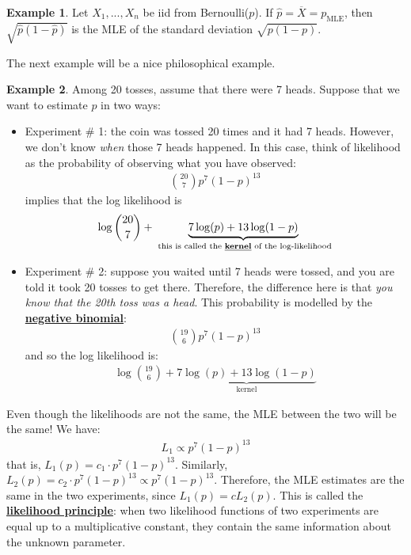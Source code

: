 \documentclass[11pt]{scrartcl}
\theoremstyle{definition}
\newtheorem{ex}{Example}
\theoremstyle{remark}
\newcommand{\dfn}[1]{\textbf{\underline{#1}}}
\begin{document}
\begin{ex}
	Let $X_1, ..., X_n$ be iid from Bernoulli($p$). If $\hat{p} = \overline{X} = p_{\text{MLE}}$, then $\sqrt{\hat{p}(1-\hat{p})}$ is the MLE of the standard deviation $\sqrt{p(1-p)}$. 
\end{ex}

The next example will be a nice philosophical example. 

\begin{ex} 
	Among 20 tosses, assume that there were 7 heads. Suppose that we want to estimate $p$ in two ways: 
	\begin{itemize}[noitemsep]
		\item Experiment \# 1: the coin was tossed 20 times and it had 7 heads. However, we don't know \emph{when} those 7 heads happened. In this case, think of likelihood as the probability of observing what you have observed: 
		\begin{align*}
			\binom{20}{7} p^7 (1-p)^{13} 	
		\end{align*}
		implies that the log likelihood is 
		\begin{align*}
			\log \binom{20}{7} + \underbrace{7 \log(p) + 13 \log(1-p)}_{\text{ this is called the \dfn{kernel} of the log-likelihood}}
		\end{align*}
		\item Experiment \# 2: suppose you waited until 7 heads were tossed, and you are told it took 20 tosses to get there. Therefore, the difference here is that \emph{you know that the 20th toss was a head}. This probability is modelled by the \dfn{negative binomial}: 
		 \begin{align*}
 			\binom{19}{6} p^7 (1-p)^{13} 
 		\end{align*}
		and so the log likelihood is: 
		\begin{align*}
			\log \binom{19}{6} + \underbrace{7 \log (p) + 13 \log (1-p)}_{\text{kernel}}	
		\end{align*}
	\end{itemize}	
	Even though the likelihoods are not the same, the MLE between the two will be the same! We have: 
	\begin{align}
		L_1 \propto p^7(1-p)^{13} 
	\end{align}
	that is, $L_1(p) = c_1 \cdot p^{7}(1-p)^{13}$. Similarly, $L_2(p)  =c_2 \cdot p^{7}(1-p)^{13} \propto p^7 (1-p)^{13}$. Therefore, the MLE estimates are the same in the two experiments, since $L_1(p) = c L_2(p)$. This is called the \dfn{likelihood principle}: when two likelihood functions of two experiments are equal up to a multiplicative constant, they contain the same information about the unknown parameter.
\end{ex}
\end{document}
